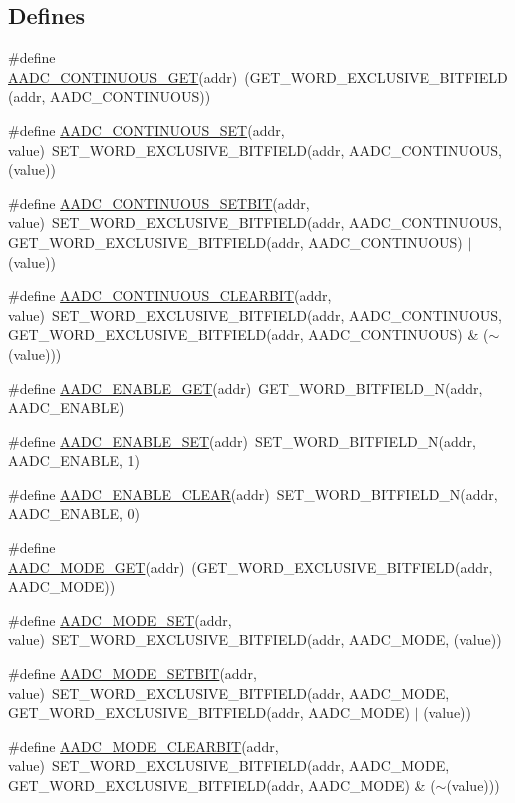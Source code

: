\subsection*{Defines}
\begin{DoxyCompactItemize}
\item 
\#define \hyperlink{a00542_a3fe9223ba72ee172b36c53910f88a874}{AADC\_\-CONTINUOUS\_\-GET}(addr)~(GET\_\-WORD\_\-EXCLUSIVE\_\-BITFIELD(addr, AADC\_\-CONTINUOUS))
\item 
\#define \hyperlink{a00542_ac3dc5b819d330ee9505d20b191720b06}{AADC\_\-CONTINUOUS\_\-SET}(addr, value)~SET\_\-WORD\_\-EXCLUSIVE\_\-BITFIELD(addr, AADC\_\-CONTINUOUS, (value))
\item 
\#define \hyperlink{a00542_a9a2f7e1370068ce9a6f1727268f4f36b}{AADC\_\-CONTINUOUS\_\-SETBIT}(addr, value)~SET\_\-WORD\_\-EXCLUSIVE\_\-BITFIELD(addr, AADC\_\-CONTINUOUS, GET\_\-WORD\_\-EXCLUSIVE\_\-BITFIELD(addr, AADC\_\-CONTINUOUS) $|$ (value))
\item 
\#define \hyperlink{a00542_a70012f1859a394634aff8ca68ceaf46c}{AADC\_\-CONTINUOUS\_\-CLEARBIT}(addr, value)~SET\_\-WORD\_\-EXCLUSIVE\_\-BITFIELD(addr, AADC\_\-CONTINUOUS, GET\_\-WORD\_\-EXCLUSIVE\_\-BITFIELD(addr, AADC\_\-CONTINUOUS) \& ($\sim$(value)))
\item 
\#define \hyperlink{a00542_ad3a78679581479b118fa8d73092863b4}{AADC\_\-ENABLE\_\-GET}(addr)~GET\_\-WORD\_\-BITFIELD\_\-N(addr, AADC\_\-ENABLE)
\item 
\#define \hyperlink{a00542_a4c6ed7f87455f1c8f08c02180802a641}{AADC\_\-ENABLE\_\-SET}(addr)~SET\_\-WORD\_\-BITFIELD\_\-N(addr, AADC\_\-ENABLE, 1)
\item 
\#define \hyperlink{a00542_acc834a969fcb7c3681d81e0ab5187316}{AADC\_\-ENABLE\_\-CLEAR}(addr)~SET\_\-WORD\_\-BITFIELD\_\-N(addr, AADC\_\-ENABLE, 0)
\item 
\#define \hyperlink{a00542_ae22de9923cc697633db75e286b1c665b}{AADC\_\-MODE\_\-GET}(addr)~(GET\_\-WORD\_\-EXCLUSIVE\_\-BITFIELD(addr, AADC\_\-MODE))
\item 
\#define \hyperlink{a00542_a5dd9e256ec52e2feca35699654d98ab3}{AADC\_\-MODE\_\-SET}(addr, value)~SET\_\-WORD\_\-EXCLUSIVE\_\-BITFIELD(addr, AADC\_\-MODE, (value))
\item 
\#define \hyperlink{a00542_ade5d7af635e60a0b06744c5b1137fb4d}{AADC\_\-MODE\_\-SETBIT}(addr, value)~SET\_\-WORD\_\-EXCLUSIVE\_\-BITFIELD(addr, AADC\_\-MODE, GET\_\-WORD\_\-EXCLUSIVE\_\-BITFIELD(addr, AADC\_\-MODE) $|$ (value))
\item 
\#define \hyperlink{a00542_abc20e0a74c29c65eb5d01a4a320cff25}{AADC\_\-MODE\_\-CLEARBIT}(addr, value)~SET\_\-WORD\_\-EXCLUSIVE\_\-BITFIELD(addr, AADC\_\-MODE, GET\_\-WORD\_\-EXCLUSIVE\_\-BITFIELD(addr, AADC\_\-MODE) \& ($\sim$(value)))

\end{DoxyCompactItemize}
